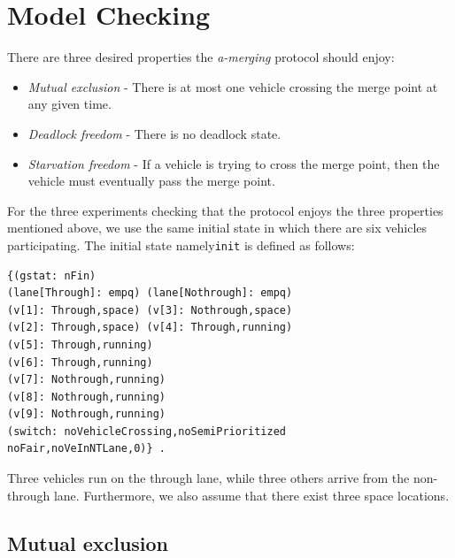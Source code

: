 \documentclass[10pt, conference, compsocconf]{IEEEtran}
\begin{document}
 
\section{Model Checking}
\label{sect_model}
There are three desired properties the \textit{a-merging} protocol should enjoy:
\begin{itemize}
    \item \textit{Mutual exclusion} - There is at most one vehicle crossing the merge point at any given time.
    \item \textit{Deadlock freedom} - There is no deadlock state.
    \item \textit{Starvation freedom} - If a vehicle is trying to cross the merge point, then the vehicle must eventually pass the merge point.
\end{itemize}


For the three experiments checking that the protocol enjoys the three properties mentioned above, we use the same initial state in which there are six vehicles participating. The initial state namely\verb!init! is defined as follows:
\begin{small}
\begin{verbatim}
{(gstat: nFin) 
(lane[Through]: empq) (lane[Nothrough]: empq) 
(v[1]: Through,space) (v[3]: Nothrough,space)
(v[2]: Through,space) (v[4]: Through,running)
(v[5]: Through,running) 
(v[6]: Through,running)
(v[7]: Nothrough,running) 
(v[8]: Nothrough,running)
(v[9]: Nothrough,running)
(switch: noVehicleCrossing,noSemiPrioritized
noFair,noVeInNTLane,0)} .
\end{verbatim}
\end{small}

\noindent
Three vehicles run on the through lane, while three others arrive from the non-through lane.
Furthermore, we also assume that there exist three space locations.

\subsection{Mutual exclusion}
\end{document}
